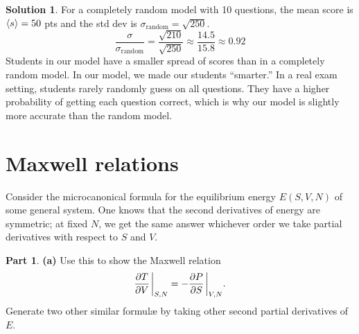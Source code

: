 \documentclass[11pt]{article}
\theoremstyle{definition}
\newtheorem{question}{Part}[section]
\newtheorem*{solution}{Solution}
\numberwithin{equation}{section}
\numberwithin{figure}{section}
\begin{document}
\begin{solution}
For a completely random model with 10 questions, the mean score is $\expval{s} = 50$ pts and the std dev is $\sigma_\text{random} = \sqrt{250}$.
\begin{equation}
\frac{\sigma}{\sigma_\text{random}} = \frac{\sqrt{210}}{\sqrt{250}} \approx \frac{14.5}{15.8} \approx 0.92
\end{equation}
Students in our model have a smaller spread of scores than in a completely random model. In our model, we made our students ``smarter.'' In a real exam setting, students rarely randomly guess on all questions. They have a higher probability of getting each question correct, which is why our model is slightly more accurate than the random model.
\end{solution}












\newpage
\section{Maxwell relations}

Consider the microcanonical formula for the equilibrium energy $E(S,V,N)$ of some general system. One knows that the second derivatives of energy are symmetric; at fixed $N$, we get the same answer whichever order we take partial derivatives with respect to $S$ and $V$.

\begin{question}
\textbf{(a)} Use this to show the Maxwell relation
\begin{equation}
\pdv{T}{V}\eval_{S,N} = - \pdv{P}{S}\eval_{V,N}.\label{eq:2.0}
\end{equation}
Generate two other similar formul{\ae} by taking other second partial derivatives of $E$.
\end{question}
\end{document}
